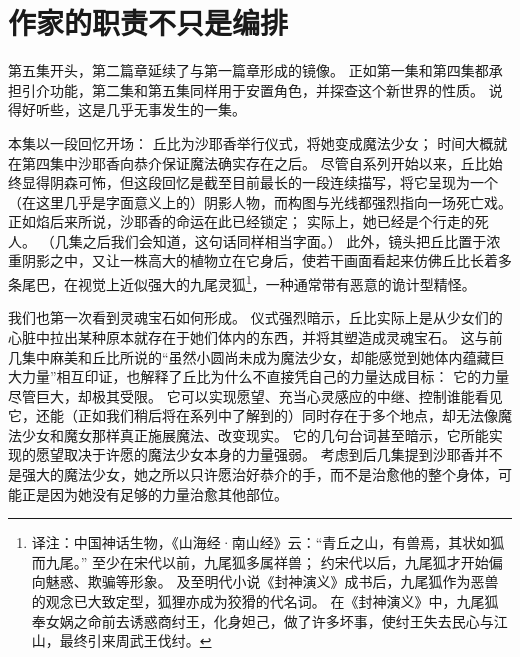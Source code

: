 \chapter[作家的职责不只是编排]{作家的职责不只是编排}



第五集开头，第二篇章延续了与第一篇章形成的镜像。
正如第一集和第四集都承担引介功能，第二集和第五集同样用于安置角色，并探查这个新世界的性质。
说得好听些，这是几乎无事发生的一集。

本集以一段回忆开场：
丘比为沙耶香举行仪式，将她变成魔法少女；
时间大概就在第四集中沙耶香向恭介保证魔法确实存在之后。
尽管自系列开始以来，丘比始终显得阴森可怖，但这段回忆是截至目前最长的一段连续描写，将它呈现为一个（在这里几乎是字面意义上的）阴影人物，而构图与光线都强烈指向一场死亡戏。
正如焰后来所说，沙耶香的命运在此已经锁定；
实际上，她已经是个行走的死人。
（几集之后我们会知道，这句话同样相当字面。）
此外，镜头把丘比置于浓重阴影之中，又让一株高大的植物立在它身后，使若干画面看起来仿佛丘比长着多条尾巴，在视觉上近似强大的九尾灵狐\footnote{%
    译注：中国神话生物，《山海经·南山经》云：“青丘之山，有兽焉，其状如狐而九尾。”
    至少在宋代以前，九尾狐多属祥兽；
    约宋代以后，九尾狐才开始偏向魅惑、欺骗等形象。
    及至明代小说《封神演义》成书后，九尾狐作为恶兽的观念已大致定型，狐狸亦成为狡猾的代名词。
    在《封神演义》中，九尾狐奉女娲之命前去诱惑商纣王，化身妲己，做了许多坏事，使纣王失去民心与江山，最终引来周武王伐纣。
}，一种通常带有恶意的诡计型精怪\cite{ref32}。

我们也第一次看到灵魂宝石如何形成。
仪式强烈暗示，丘比实际上是从少女们的心脏中拉出某种原本就存在于她们体内的东西，并将其塑造成灵魂宝石。
这与前几集中麻美和丘比所说的“虽然小圆尚未成为魔法少女，却能感觉到她体内蕴藏巨大力量”相互印证，也解释了丘比为什么不直接凭自己的力量达成目标：
它的力量尽管巨大，却极其受限。
它可以实现愿望、充当心灵感应的中继、控制谁能看见它，还能（正如我们稍后将在系列中了解到的）同时存在于多个地点，却无法像魔法少女和魔女那样真正施展魔法、改变现实。
它的几句台词甚至暗示，它所能实现的愿望取决于许愿的魔法少女本身的力量强弱。
考虑到后几集提到沙耶香并不是强大的魔法少女，她之所以只许愿治好恭介的手，而不是治愈他的整个身体，可能正是因为她没有足够的力量治愈其他部位。

